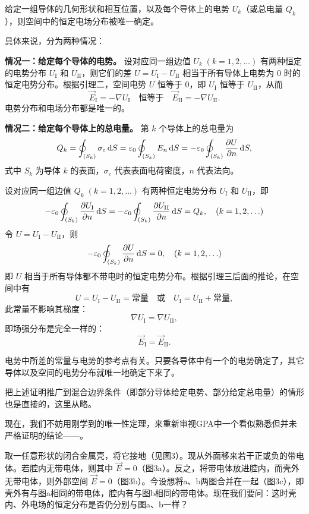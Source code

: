 \begin{law}[静电边值问题的唯一性定理]
    给定一组导体的几何形状和相互位置，以及每个导体上的电势 $U_k$（或总电量 $Q_k$），则空间中的恒定电场分布被唯一确定。
\end{law}

具体来说，分为两种情况：

\textbf{情况一：给定每个导体的电势。}
设对应同一组边值 $U_k \;(k=1,2,\ldots)$ 有两种恒定的电势分布 $U_{\text{I}}$ 和 $U_{\text{II}}$，则它们的差 $U = U_{\text{I}} - U_{\text{II}}$ 相当于所有导体上电势为 $0$ 时的恒定电势分布。根据引理二，空间电势 $U$ 恒等于 $0$，即 $U_{\text{I}}$ 恒等于 $U_{\text{II}}$，从而
\[\vec{E}_{\text{I}} = -\nabla U_{\text{I}} \quad \text{恒等于} \quad \vec{E}_{\text{II}} = -\nabla U_{\text{II}}.\]
电势分布和电场分布都是唯一的。

\textbf{情况二：给定每个导体上的总电量。}
第 $k$ 个导体上的总电量为
\[Q_k = \oint_{(S_k)} \sigma_e \dif S = \varepsilon_0 \oint_{(S_k)} E_n \dif S = -\varepsilon_0 \oint_{(S_k)} \frac{\partial U}{\partial n} \dif S,\]
式中 $S_k$ 为导体 $k$ 的表面，$\sigma_e$ 代表表面电荷密度，$n$ 代表法向。

设对应同一组边值 $Q_k \;(k=1, 2, \ldots)$ 有两种恒定电势分布 $U_{\text{I}}$ 和 $U_{\text{II}}$，即
\[-\varepsilon_0 \oint_{(S_k)} \frac{\partial U_{\text{I}}}{\partial n} \dif S = -\varepsilon_0 \oint_{(S_k)} \frac{\partial U_{\text{II}}}{\partial n} \dif S = Q_k, \quad (k = 1, 2, \ldots)\]
令 $U = U_{\text{I}} - U_{\text{II}}$，则
\[-\varepsilon_0 \oint_{(S_k)} \frac{\partial U}{\partial n} \dif S = 0, \quad (k = 1, 2, \ldots)\]
即 $U$ 相当于所有导体都不带电时的恒定电势分布。根据引理三后面的推论，在空间中有
\[U = U_{\text{I}} - U_{\text{II}} = \text{常量} \quad \text{或} \quad U_{\text{I}} = U_{\text{II}} + \text{常量},\]
此常量不影响其梯度：
\[\nabla U_{\text{I}} = \nabla U_{\text{II}},\]
即场强分布是完全一样的：
\[\vec{E}_{\text{I}} = \vec{E}_{\text{II}}.\]

电势中所差的常量与电势的参考点有关。只要各导体中有一个的电势确定了，其它导体以及空间的电势分布就唯一地确定下来了。

把上述证明推广到混合边界条件（即部分导体给定电势、部分给定总电量）的情形也是直接的，这里从略。

现在，我们不妨用刚学到的唯一性定理，来重新审视GPA中一个看似熟悉但并未严格证明的结论——。

\begin{ex}[静电屏蔽]
    取一任意形状的闭合金属壳，将它接地（见图3）。现从外面移来若干正或负的带电体。若腔内无带电体，则其中 $\vec{E}=0$（图3a）。反之，将带电体放进腔内，而壳外无带电体，则外部空间 $\vec{E}=0$（图3b）。今设想将a、b两图合并在一起（图3c），即壳外有与图a相同的带电体，腔内有与图b相同的带电体。现在我们要问：这时壳内、外电场的恒定分布是否仍分别与图a、b一样？
\end{ex}

